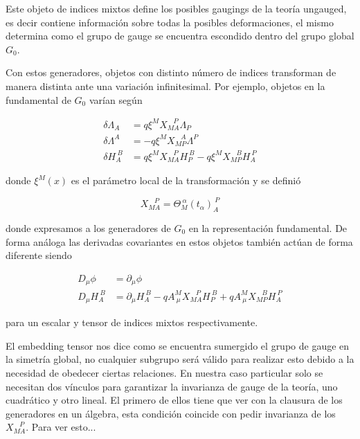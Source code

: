\documentclass{article}
\numberwithin{equation}{section}
\begin{document}
Este objeto de indices mixtos define los posibles gaugings de la teoría ungauged, es decir contiene información sobre todas la posibles deformaciones, el mismo determina como el grupo de gauge se encuentra escondido dentro del grupo global $ G_0 $.

Con estos generadores, objetos con distinto número de indices transforman de manera distinta ante una variación infinitesimal. Por ejemplo, objetos en la fundamental de $ G_0 $ varían según

\begin{equation}\label{deltaindices}
\begin{aligned}
\delta \Lambda_A &= q \xi^M X_{M A}^{\ \ \ \ P} \Lambda_P\\
\delta \Lambda^A &= -q \xi^M X_{M P}^{\ \ \ \ A} \Lambda^P\\
\delta H_A^{\ B} &= q \xi^M X_{M A}^{\ \ \ \ P} H_P^{\ B} -q \xi^M X_{M P}^{\ \ \ \ B} H_A^{\ P}
\end{aligned}
\end{equation}

donde $ \xi^M (x)  $ es el parámetro local de la transformación y se definió 

\begin{equation}
X_{M A}^{\ \ \ \ P} = \Theta_M^{\ \alpha} \left(t_{\alpha}\right)_A^{\ P}
\end{equation}

donde expresamos a los generadores de $ G_0 $ en la representación fundamental. De forma análoga las derivadas covariantes en estos objetos también actúan de forma diferente siendo 

\begin{equation}\label{Dindices}
\begin{aligned}
D_{\mu} \phi &= \partial_{\mu} \phi\\
D_{\mu} H_A^{\ B} &= \partial_{\mu} H_A^{\ B} -q A^M_{\ \mu} X_{M A}^{\ \ \ \ P} H_P^{\ B} + q A^M_{\ \mu} X_{M P}^{\ \ \ \ B} H_A^{\ P}
\end{aligned}
\end{equation}

para un escalar y tensor de indices mixtos respectivamente.


El embedding tensor nos dice como se encuentra sumergido el grupo de gauge en la simetría global, no cualquier subgrupo será válido para realizar esto debido a la necesidad de obedecer ciertas relaciones. En nuestra caso particular solo se necesitan dos vínculos para garantizar la invarianza de gauge de la teoría, uno cuadrático y otro lineal. El primero de ellos tiene que ver con la clausura de los generadores en un álgebra, esta condición coincide con pedir invarianza de los $X_{M A}^{\ \ \ \ P} $. Para ver esto...\\
\end{document}
